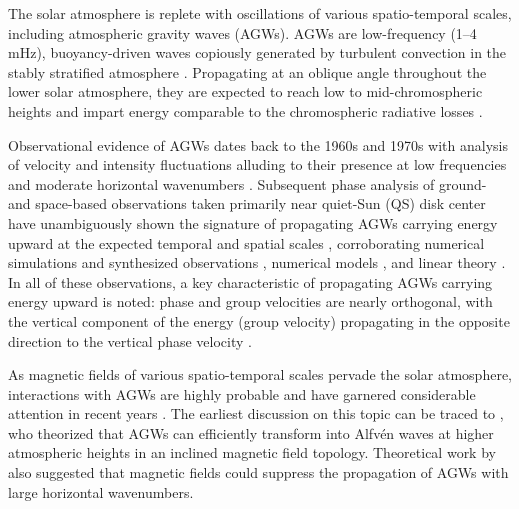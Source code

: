 \documentclass[preprint2,linenumbers]{aastex701}
\begin{document}
The solar atmosphere is replete with oscillations of various spatio-temporal scales, including atmospheric gravity waves (AGWs).
AGWs are low-frequency (1--4\,mHz), buoyancy-driven waves copiously generated by turbulent convection in the stably stratified atmosphere \citep{1967_Lighthill, 1967_Stein}.
Propagating at an oblique angle throughout the lower solar atmosphere, they are expected to reach low to mid-chromospheric heights \citep{1981_Mihalas_Toomre, 1982_Mihalas_Toomre} and impart energy comparable to the chromospheric radiative losses \citep{2008_Straus_Fleck_Jeffries_etal, 2009_Straus_Fleck_Jeffries_Severino_Steffen_Tarbell}.

Observational evidence of AGWs dates back to the 1960s and 1970s with analysis of velocity and intensity fluctuations alluding to their presence at low frequencies and moderate horizontal wavenumbers \citep{1968_Frazier2, 1974_Deubner}.
Subsequent phase analysis of ground- and space-based observations taken primarily near quiet-Sun (QS) disk center have unambiguously shown the signature of propagating AGWs carrying energy upward at the expected temporal and spatial scales \citep[e.g.,][]{1989_Deubner_Fleck, 2023_Kumar_Jumar_Rajaguru_Mathew_Bayanna}, corroborating numerical simulations and synthesized observations \citep[e.g.,][]{2017_Vigeesh, 2020_Vigeesh_Roth}, numerical models \citep[e.g.,][]{2009_Newington_Cally, 2016_Hague_Erdelyi}, and linear theory \citep[e.g.,][]{1981_Mihalas_Toomre, 1982_Mihalas_Toomre}.
In all of these observations, a key characteristic of propagating AGWs carrying energy upward is noted: phase and group velocities are nearly orthogonal, with the vertical component of the energy (group velocity) propagating in the opposite direction to the vertical phase velocity \citep{1960_Hines}.

As magnetic fields of various spatio-temporal scales pervade the solar atmosphere, interactions with AGWs are highly probable and have garnered considerable attention in recent years \citep[e.g.,][]{2011_Newington_Cally, 2020_Vigeesh_Roth, 2023_Kumar_Jumar_Rajaguru_Mathew_Bayanna}.
The earliest discussion on this topic can be traced to \citet{1967_Lighthill}, who theorized that AGWs can efficiently transform into Alfv\'{e}n waves at higher atmospheric heights in an inclined magnetic field topology.
Theoretical work by \citet{1974_Stein_Leibacher} also suggested that magnetic fields could suppress the propagation of AGWs with large horizontal wavenumbers.
\end{document}
